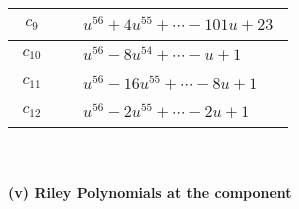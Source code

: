 \documentclass[1p]{elsarticle_modified}
\theoremstyle{definition}
\begin{document}
\begin{tabular}{m{50pt}|m{274pt}}
\hline $$\begin{aligned}c_{9}\end{aligned}$$&$\begin{aligned}
&u^{56}+4 u^{55}+\cdots-101 u+23
\end{aligned}$\\
\hline $$\begin{aligned}c_{10}\end{aligned}$$&$\begin{aligned}
&u^{56}-8 u^{54}+\cdots- u+1
\end{aligned}$\\
\hline $$\begin{aligned}c_{11}\end{aligned}$$&$\begin{aligned}
&u^{56}-16 u^{55}+\cdots-8 u+1
\end{aligned}$\\
\hline $$\begin{aligned}c_{12}\end{aligned}$$&$\begin{aligned}
&u^{56}-2 u^{55}+\cdots-2 u+1
\end{aligned}$\\
\hline
\end{tabular}\\~\\
\newpage\renewcommand{\arraystretch}{1}
\flushleft \textbf{(v) Riley Polynomials at the component}\newline \\
\end{document}
